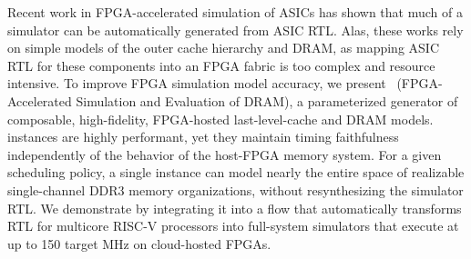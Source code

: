 Recent work in FPGA-accelerated simulation of ASICs has shown that much
of a simulator can be automatically generated from ASIC RTL.  Alas, these works rely on simple models of
the outer cache hierarchy and DRAM, as
mapping ASIC RTL for these components into an FPGA fabric is too
complex and resource intensive.  To improve FPGA simulation model
accuracy, we present \PNAME~(FPGA-Accelerated Simulation and Evaluation of DRAM), a
parameterized generator of composable, high-fidelity, FPGA-hosted
last-level-cache and DRAM models. \PNAME instances are highly
performant, yet they maintain timing faithfulness independently of the
behavior of the host-FPGA memory system.
For a given scheduling policy, a single \PNAME instance can model
nearly the entire space of realizable single-channel DDR3 memory
organizations, without resynthesizing the simulator RTL.
We demonstrate \PNAME by integrating it into a flow that automatically
transforms RTL for multicore RISC-V processors into full-system
simulators that execute at up to 150 target MHz on cloud-hosted FPGAs.
